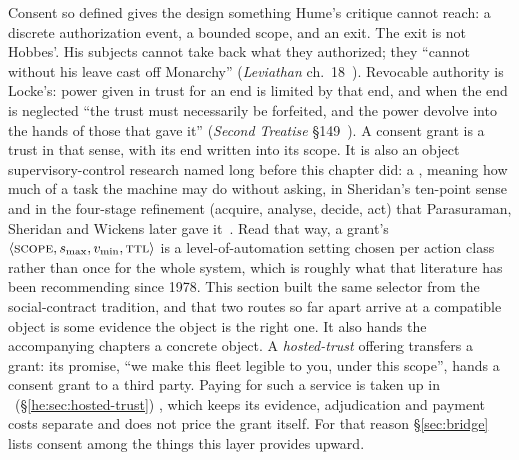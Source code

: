 \documentclass[11pt,a4paper]{article}
\theoremstyle{definition}
\theoremstyle{plain}
\begin{document}
Consent so defined gives the design something Hume's critique cannot reach: a
discrete authorization event, a bounded scope, and an exit. The exit is not
Hobbes'. His subjects cannot take back what they authorized; they ``cannot
without his leave cast off Monarchy'' (\emph{Leviathan} ch.~18~).
Revocable authority is Locke's: power given in trust for an end is limited by
that end, and when the end is neglected ``the trust must necessarily be
forfeited, and the power devolve into the hands of those that gave it''
(\emph{Second Treatise} \S149~). A consent grant is a trust in
that sense, with its end written into its scope. It is also an object
supervisory-control research named long before this chapter did: a
, meaning how much of a task the machine may do
without asking, in Sheridan's ten-point sense and in the
four-stage refinement (acquire, analyse, decide, act) that Parasuraman,
Sheridan and Wickens later gave it~. Read
that way, a grant's $\langle\textsc{scope}, s_{\max}, v_{\min},
\textsc{ttl}\rangle$ is a level-of-automation setting chosen per action class
rather than once for the whole system, which is roughly what that literature
has been recommending since 1978. This section built the same selector from the
social-contract tradition, and that two routes so far apart arrive at a compatible
object is some evidence the object is the right one. It also hands the
accompanying chapters a concrete object. A \emph{hosted-trust} offering
transfers a grant: its promise, ``we make this fleet legible to you, under this
scope'', hands a consent grant to a third party. Paying for such a service is
taken up in %
\ifpdbook
\ (\S\ref{he:sec:hosted-trust})%
\fi
, which keeps its evidence, adjudication and payment costs separate and does not
price the grant itself. For that reason
\S\ref{sec:bridge} lists consent among the things this layer provides upward.
\end{document}
